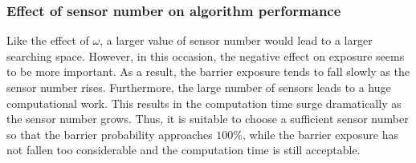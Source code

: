 \subsubsection{Effect of sensor number on algorithm performance}

Like the effect of $\omega$, a larger value of sensor number would lead to a larger searching space. However, in this occasion, the negative effect on exposure seems to be more important. As a result, the barrier exposure tends to fall slowly as the sensor number rises. Furthermore, the large number of sensors leads to a huge computational work. This results in the computation time surge dramatically as the sensor number grows. Thus, it is suitable to choose a sufficient sensor number so that the barrier probability approaches $100\%$, while the barrier exposure has not fallen too considerable and the computation time is still acceptable.

